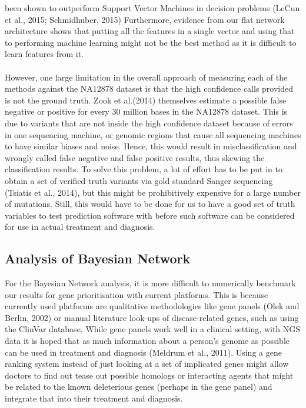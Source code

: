 \documentclass{article}
\begin{document}
been shown to outperform Support Vector Machines in decision problems (LeCun et al., 2015; Schmidhuber, 2015) Furthermore, evidence from our flat network architecture shows that putting all the features in a single vector and using that to performing machine learning might not be the best method as it is difficult to learn features from it. \\\\ However, one large limitation in the overall approach of measuring each of the methods against the NA12878 dataset is that the high confidence calls provided is not the ground truth. Zook et al.(2014) themselves estimate a possible false negative or positive for every 30 million bases in the NA12878 dataset. This is due to variants that are not inside the high confidence dataset because of errors in one sequencing machine, or genomic regions that cause all sequencing machines to have similar biases and noise. Hence, this would result in misclassification and wrongly called false negative and false positive results, thus skewing the classification results. To solve this problem, a lot of effort has to be put in to obtain a set of verified truth variants via gold standard Sanger sequencing (Tsiatis et al., 2014), but this might be prohibitively expensive for a large number of mutations. Still, this would have to be done for us to have a good set of truth variables to test prediction software with before such software can be considered for use in actual treatment and diagnosis. 
\subsection{Analysis of Bayesian Network}
For the Bayesian Network analysis, it is more difficult to numerically benchmark our results for gene prioritisation with current platforms. This is because currently used platforms are qualitative methodologies like gene panels (Olek and Berlin, 2002) or manual literature look-ups of disease-related genes, such as using the ClinVar database. While gene panels work well in a clinical setting, with NGS data it is hoped that as much information about a person's genome as possible can be used in treatment and diagnosis (Meldrum et al., 2011). Using a gene ranking system instead of just looking at a set of implicated genes might allow doctors to find out tease out possible homologs or interacting agents that might be related to the known deleterious genes (perhaps in the gene panel) and integrate that into their treatment and diagnosis.
\end{document}

